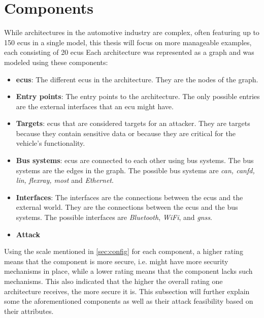 \section{Components}
\label{sec:components}

While architectures in the automotive industry are complex, often featuring up to 150 \gls{ecu}s in a single model, 
this thesis will focus on more manageable examples, each consisting of 20 \gls{ecu}s
Each architecture was represented as a graph and was modeled using these components:

\begin{itemize}

    \item \textbf{\gls{ecu}s}: The different \gls{ecu}s in the architecture. They are the nodes of the graph.
    
    \item \textbf{Entry points}: The entry points to the architecture. The only possible entries are the external interfaces that an \gls{ecu} might have.
    
    \item \textbf{Targets}: \gls{ecu}s that are considered targets for an attacker. They are targets because they contain sensitive data or because they are critical for the vehicle's functionality.
    
    \item \textbf{Bus systems}: \gls{ecu}s are connected to each other using bus systems. The bus systems are the edges in the graph. The possible bus systems are \textit{\gls{can}, \gls{canfd}, \gls{lin}, \gls{flexray}, \gls{most}} and \textit{Ethernet}.
    
    \item \textbf{Interfaces}: The interfaces are the connections between the \gls{ecu}s and the external world. They are the connections between the \gls{ecu}s and the bus systems. 
    The possible interfaces are \textit{Bluetooth}, \textit{WiFi}, and \textit{\gls{gnss}}.
    
    \item \textbf{Attack }
    
\end{itemize}

Using the scale mentioned in \ref{sec:config} for each component, a higher rating means that the component is more secure, i.e. might have more security mechanisms in place,
while a lower rating means that the component lacks such mechanisms.
This also indicated that the higher the overall rating one architecture receives, the more secure it is.
This subsection will further explain some the aforementioned components as well as their attack feasibility based on their attributes.

